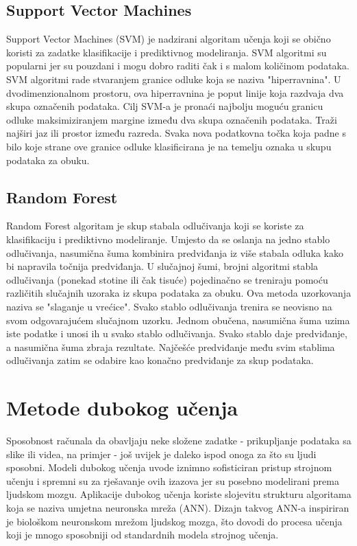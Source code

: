 \documentclass[]{foi}
\begin{document}
\subsection{Support Vector Machines}
Support Vector Machines (SVM) je nadzirani algoritam učenja koji se obično koristi za zadatke klasifikacije i prediktivnog modeliranja. SVM algoritmi su popularni jer su pouzdani i mogu dobro raditi čak i s malom količinom podataka. SVM algoritmi rade stvaranjem granice odluke koja se naziva "hiperravnina". U dvodimenzionalnom prostoru, ova hiperravnina je poput linije koja razdvaja dva skupa označenih podataka. 
Cilj SVM-a je pronaći najbolju moguću granicu odluke maksimiziranjem margine između dva skupa označenih podataka. Traži najširi jaz ili prostor između razreda. Svaka nova podatkovna točka koja padne s bilo koje strane ove granice odluke klasificirana je na temelju oznaka u skupu podataka za obuku. \cite{Coursera2024}

\subsection{Random Forest}
Random Forest algoritam je skup stabala odlučivanja koji se koriste za klasifikaciju i prediktivno modeliranje. Umjesto da se oslanja na jedno stablo odlučivanja, nasumična šuma kombinira predviđanja iz više stabala odluka kako bi napravila točnija predviđanja. U slučajnoj šumi, brojni algoritmi stabla odlučivanja (ponekad stotine ili čak tisuće) pojedinačno se treniraju pomoću različitih slučajnih uzoraka iz skupa podataka za obuku. Ova metoda uzorkovanja naziva se "slaganje u vrećice". Svako stablo odlučivanja trenira se neovisno na svom odgovarajućem slučajnom uzorku. 
Jednom obučena, nasumična šuma uzima iste podatke i unosi ih u svako stablo odlučivanja. Svako stablo daje predviđanje, a nasumična šuma zbraja rezultate. Najčešće predviđanje među svim stablima odlučivanja zatim se odabire kao konačno predviđanje za skup podataka. \cite{Coursera2024}

\section{Metode dubokog učenja}
Sposobnost računala da obavljaju neke složene zadatke - prikupljanje podataka sa slike ili videa, na primjer - još uvijek je daleko ispod onoga za što su ljudi sposobni. Modeli dubokog učenja uvode iznimno sofisticiran pristup strojnom učenju i spremni su za rješavanje ovih izazova jer su posebno modelirani prema ljudskom mozgu. Aplikacije dubokog učenja koriste slojevitu strukturu algoritama koja se naziva umjetna neuronska mreža (ANN). Dizajn takvog ANN-a inspiriran je biološkom neuronskom mrežom ljudskog mozga, što dovodi do procesa učenja koji je mnogo sposobniji od standardnih modela strojnog učenja. \cite{Wolfewicz}
\end{document}
